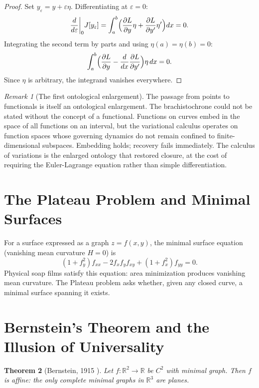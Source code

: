 \documentclass[12pt,oneside]{book}
\theoremstyle{plain}
\newtheorem{theorem}{Theorem}[chapter]
\theoremstyle{definition}
\theoremstyle{remark}
\newtheorem{remark}[theorem]{Remark}
\newcommand{\Real}{\mathbb{R}}
\begin{document}
\begin{proof}
Set $y_\varepsilon = y + \varepsilon\eta$. Differentiating at $\varepsilon = 0$:
\[
  \frac{d}{d\varepsilon}\bigg|_0 J[y_\varepsilon]
  = \int_a^b \Bigl(\frac{\partial L}{\partial y}\eta
    + \frac{\partial L}{\partial y'}\eta'\Bigr) dx = 0.
\]
Integrating the second term by parts and using $\eta(a) = \eta(b) = 0$:
\[
  \int_a^b \Bigl(\frac{\partial L}{\partial y}
  - \frac{d}{dx}\frac{\partial L}{\partial y'}\Bigr)\eta\, dx = 0.
\]
Since $\eta$ is arbitrary, the integrand vanishes everywhere.
\end{proof}

\begin{remark}[The first ontological enlargement]
The passage from points to functionals is itself an ontological enlargement.
The brachistochrone could not be stated without the concept of a functional.
Functions on curves embed in the space of all functions on an interval,
but the variational calculus operates on function spaces whose governing
dynamics do not remain confined to finite-dimensional subspaces. Embedding
holds; recovery fails immediately. The calculus of variations is the enlarged
ontology that restored closure, at the cost of requiring the Euler-Lagrange
equation rather than simple differentiation.
\end{remark}

\section{The Plateau Problem and Minimal Surfaces}

For a surface expressed as a graph $z = f(x,y)$, the minimal surface equation
(vanishing mean curvature $H = 0$) is
\[
  (1 + f_y^2)f_{xx} - 2f_x f_y f_{xy} + (1 + f_x^2)f_{yy} = 0.
\]
Physical soap films satisfy this equation: area minimization produces
vanishing mean curvature. The Plateau problem asks whether, given any closed
curve, a minimal surface spanning it exists.

\section{Bernstein's Theorem and the Illusion of Universality}

\begin{theorem}[Bernstein, 1915 \cite{bernstein1915}]
Let $f : \Real^2 \to \Real$ be $C^2$ with minimal graph. Then $f$ is affine:
the only complete minimal graphs in $\Real^3$ are planes.
\end{theorem}
\end{document}
